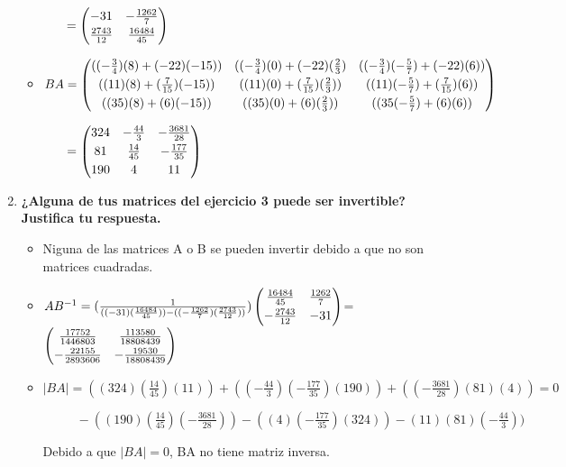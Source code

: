 \documentclass{report}
\begin{document}
\begin{enumerate}
\begin{itemize}
    \vspace{.2cm}
    $\phantom{AB}=\begin{pmatrix}\vspace{.1cm}-31 & -\frac{1262}{7} \\ \frac{2743}{12} & \frac{16484}{45}\end{pmatrix}$
    \vspace{.3cm}
    \item $BA=\begin{pmatrix}\vspace{.1cm}((-\frac{3}{4})(8)+(-22)(-15)) & ((-\frac{3}{4})(0)+(-22)(\frac{2}{3}) & ((-\frac{3}{4})(-\frac{5}{7})+(-22)(6)) \\\vspace{.1cm}((11)(8)+(\frac{7}{15})(-15)) & ((11)(0)+(\frac{7}{15})(\frac{2}{3})) & ((11)(-\frac{5}{7})+(\frac{7}{15})(6)) \\((35)(8)+(6)(-15)) & ((35)(0)+(6)(\frac{2}{3})) & ((35(-\frac{5}{7})+(6)(6))\end{pmatrix}$
    
    \vspace{.2cm}
    $\phantom{AB}=\begin{pmatrix}\vspace{.1cm}324 & -\frac{44}{3} & -\frac{3681}{28} \\\vspace{.1cm}81 & \frac{14}{45} & -\frac{177}{35} \\190 & 4 & 11\end{pmatrix}$
\end{itemize}
\item {\bfseries¿Alguna de tus matrices del ejercicio 3 puede ser invertible? Justifica tu respuesta.}
\begin{itemize}
    \item Niguna de las matrices A o B se pueden invertir debido a que no son matrices cuadradas.
    \item $AB^{-1}=(\frac{1}{((-31)(\frac{16484}{45}))-((-\frac{1262}{7})(\frac{2743}{12}))})\begin{pmatrix}\vspace{.1cm}\frac{16484}{45} & \frac{1262}{7} \\ -\frac{2743}{12} & -31\end{pmatrix}$\qquad =
    $\begin{pmatrix}\vspace{.1cm}\frac{17752}{1446803} & \frac{113580}{18808439} \\ -\frac{22155}{2893606} & -\frac{19530}{18808439}\end{pmatrix}$    
    \vspace{.3cm}
    \item $|BA|=((324)(\frac{14}{45})(11))+((-\frac{44}{3})(-\frac{177}{35})(190))+((-\frac{3681}{28})(81)(4))=0$ 
    
    \vspace{.1cm}
    $\phantom{|B|=}-((190)(\frac{14}{45})(-\frac{3681}{28}))-((4)(-\frac{177}{35})(324))-(11)(81)(-\frac{44}{3}))$
    
    \vspace{.2cm}
    Debido a que $|BA|=0$, BA no tiene matriz inversa. 
\end{itemize}
\end{enumerate}
\end{document}
